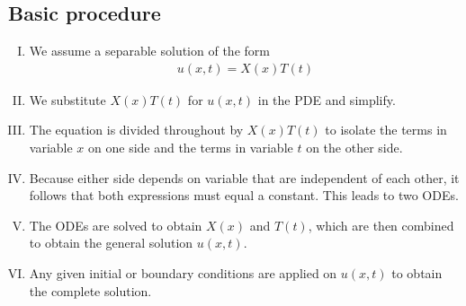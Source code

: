     \subsection{Basic procedure}
        \begin{enumerate}[I.]
            \item We assume a separable solution of the form
            \begin{align*}
                u(x,t)=X(x)T(t)
            \end{align*}

            \item We substitute $X(x)T(t)$ for $u(x,t)$ in the PDE and simplify.

            \item The equation is divided throughout by $X(x)T(t)$ to isolate the terms in variable $x$ on one side and the terms in variable $t$ on the other side.

            \item Because either side depends on variable that are independent of each other, it follows that both expressions must equal a constant. This leads to two ODEs.

            \item The ODEs are solved to obtain $X(x)$ and $T(t)$, which are then combined to obtain the general solution $u(x,t)$.

            \item Any given initial or boundary conditions are applied on $u(x,t)$ to obtain the complete solution.
        \end{enumerate}

